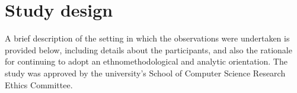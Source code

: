 








\section{Study design}\label{sec:empirical cafe design}
 \begin{revisedsubmission}
A brief description of the setting in which the observations were undertaken is provided below, including details about the participants, and also the rationale for continuing to adopt an ethnomethodological and analytic orientation.
The study was approved by the university's School of Computer Science Research Ethics Committee.
\end{revisedsubmission}



